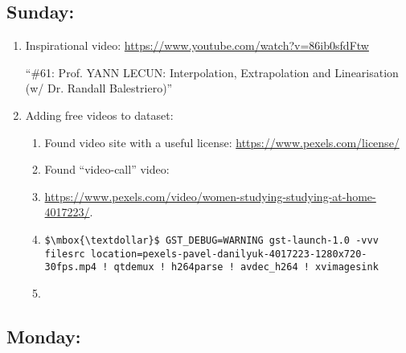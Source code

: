 \documentclass[12pt,oneside]{book}
\begin{document}
  \subsection*{Sunday:}
  \begin{enumerate}
    \item Inspirational video: \url{https://www.youtube.com/watch?v=86ib0sfdFtw}
    
    ``\#61: Prof. YANN LECUN: Interpolation, Extrapolation and Linearisation (w/ Dr. Randall Balestriero)''
    
    \item Adding free videos to dataset:
    
    \begin{enumerate}
    \item Found video site with a useful license: \url{https://www.pexels.com/license/}

    \item Found ``video-call'' video:
    
    \item \url{https://www.pexels.com/video/women-studying-studying-at-home-4017223/}.

    \item
    \begin{lstlisting}
$\mbox{\textdollar}$ GST_DEBUG=WARNING gst-launch-1.0 -vvv filesrc location=pexels-pavel-danilyuk-4017223-1280x720-30fps.mp4 ! qtdemux ! h264parse ! avdec_h264 ! xvimagesink
    \end{lstlisting}

    \item

  \end{enumerate}

  \end{enumerate}

  \subsection*{Monday:}

  \begin{lstlisting}

  \end{lstlisting}


  \printbibliography[title={Bibliografía},heading=bibintoc]
\end{document}

